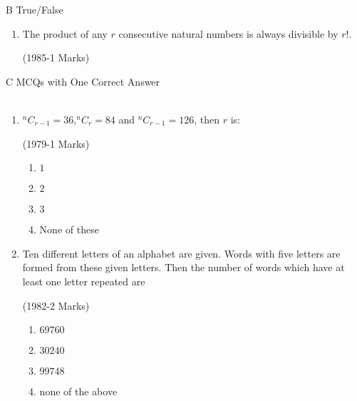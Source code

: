 \documentclass[journal,10pt,twocolumn]{IEEEtran}
\theoremstyle{remark}
\begin{document}
 B True/False \\
\begin{enumerate} 
\item The product of any $r$ consecutive natural numbers is always
 divisible by $r!.$
 
\hfill {(1985-1 Marks)}  \\
\end{enumerate} 
C MCQs with One Correct Answer\\
\\
\begin{enumerate}
\item  $^nC_{r-1}=36$,$^nC_r=84$ and $^nC_{r-1}=126$, then $r$ is:

\hfill {(1979-1 Marks)}\\
\begin{enumerate}
 \item $1$
 \item $2$
 \item $3$
\item  None of these
\end{enumerate}
\item Ten different letters of an alphabet are given. Words with
 five letters are formed from these given letters. Then the
 number of words which have at least one letter repeated are
 
\hfill {(1982-2 Marks)}\\
\begin{enumerate}
 \item $69760$
 \item $30240$
 \item $99748$
 \item none of the above
 \end{enumerate}
\end{enumerate}
\end{document}
